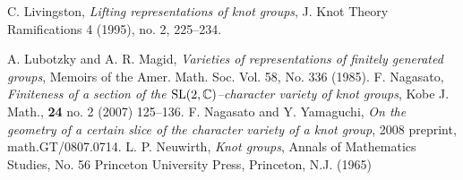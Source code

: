\documentclass[12pt]{amsart}
\theoremstyle{plain}
\theoremstyle{remark}
\begin{document}
\begin{thebibliography}{100000}
C. Livingston, {\em  Lifting representations of knot groups},  J. Knot Theory Ramifications  4  (1995),  no. 2, 225--234.

A. Lubotzky and A. R. Magid, {\em Varieties of representations of finitely generated groups}, Memoirs of the Amer. Math. Soc. Vol.  58, No. 336 (1985).
F. Nagasato,
{\em Finiteness of a section of the ${{\rm SL}}(2,{{\mathbb C}})$--character variety of knot groups},  Kobe J. Math., {\bf 24} no. 2 (2007) 125--136.
F. Nagasato and Y. Yamaguchi,
{\em On the geometry of a certain slice of the character variety of a knot group}, 2008 preprint,
{math.GT/0807.0714}.
L. P. Neuwirth, {\em Knot groups}, Annals of Mathematics Studies, No. 56 Princeton University Press, Princeton, N.J. (1965)

\end{thebibliography}
\end{document}
